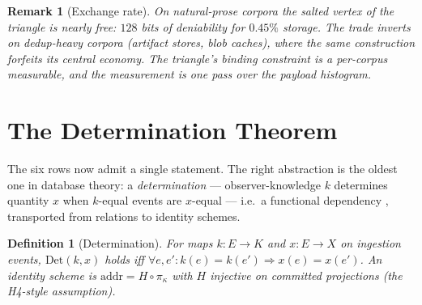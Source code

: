\documentclass[10pt]{article}
\newtheorem{definition}[theorem]{Definition}
\newtheorem{remark}[theorem]{Remark}
\begin{document}
\begin{remark}[Exchange rate]\label{rem:exchange}
On natural-prose corpora the salted vertex of the triangle is \emph{nearly free}: $128$ bits of deniability for $0.45\%$ storage. The trade inverts on dedup-heavy corpora (artifact stores, blob caches), where the same construction forfeits its central economy. The triangle's binding constraint is a per-corpus measurable, and the measurement is one pass over the payload histogram.
\end{remark}

\section{The Determination Theorem}\label{sec:determination}

The six rows now admit a single statement. The right abstraction is the oldest one in database theory: a \emph{determination} --- observer-knowledge $k$ determines quantity $x$ when $k$-equal events are $x$-equal --- i.e.\ a functional dependency \cite{Armstrong74}, transported from relations to identity schemes.

\begin{definition}[Determination]\label{def:det}
For maps $k : E \to K$ and $x : E \to X$ on ingestion events, $\mathrm{Det}(k, x)$ holds iff $\forall e, e'\!: k(e) = k(e') \Rightarrow x(e) = x(e')$. An identity scheme is $\mathrm{addr} = H \circ \pi_\kappa$ with $H$ injective on committed projections (the H4-style assumption).
\end{definition}
\end{document}
